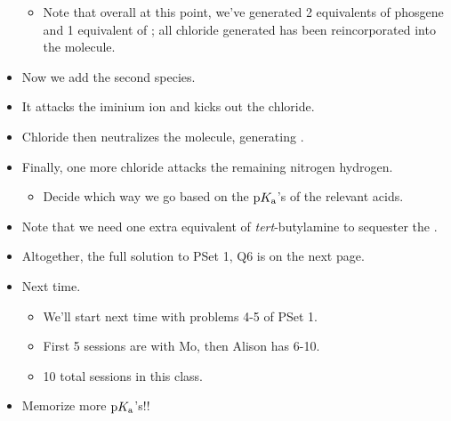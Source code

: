 \documentclass[../notes.tex]{subfiles}
\begin{document}
\begin{itemize}
    \begin{itemize}
        \item Note that overall at this point, we've generated 2 equivalents of phosgene and 1 equivalent of ; all chloride generated has been reincorporated into the molecule.
    \end{itemize}
    \item Now we add the second species.
    \item It attacks the iminium ion and kicks out the chloride.
    \item Chloride then neutralizes the molecule, generating .
    \item Finally, one more chloride attacks the remaining nitrogen hydrogen.
    \begin{itemize}
        \item Decide which way we go based on the $\textup{p}K_\textup{a}$'s of the relevant acids.
    \end{itemize}
    \item Note that we need one extra equivalent of \emph{tert}-butylamine to sequester the .
    \item Altogether, the full solution to PSet 1, Q6 is on the next page.
    
    \item Next time.
    \begin{itemize}
        \item We'll start next time with problems 4-5 of PSet 1.
        \item First 5 sessions are with Mo, then Alison has 6-10.
        \item 10 total sessions in this class.
    \end{itemize}
    \item Memorize more $\textup{p}K_\textup{a}$'s!!
\end{itemize}
\end{document}
